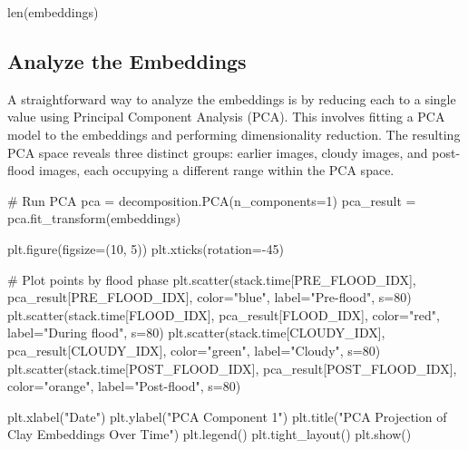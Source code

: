 \documentclass[
  letterpaper,
  DIV=11,
  numbers=noendperiod]{scrreprt}
\newenvironment{Shaded}{\begin{snugshade}}{\end{snugshade}}
\newcommand{\BuiltInTok}[1]{\textcolor[rgb]{0.00,0.23,0.31}{#1}}
\newcommand{\CommentTok}[1]{\textcolor[rgb]{0.37,0.37,0.37}{#1}}
\newcommand{\DecValTok}[1]{\textcolor[rgb]{0.68,0.00,0.00}{#1}}
\newcommand{\NormalTok}[1]{\textcolor[rgb]{0.00,0.23,0.31}{#1}}
\newcommand{\OperatorTok}[1]{\textcolor[rgb]{0.37,0.37,0.37}{#1}}
\newcommand{\StringTok}[1]{\textcolor[rgb]{0.13,0.47,0.30}{#1}}
\begin{document}
\begin{Shaded}
\begin{Highlighting}[]
\BuiltInTok{len}\NormalTok{(embeddings)}
\end{Highlighting}
\end{Shaded}

\subsection{Analyze the Embeddings}\label{analyze-the-embeddings-1}

A straightforward way to analyze the embeddings is by reducing each to a
single value using Principal Component Analysis (PCA). This involves
fitting a PCA model to the embeddings and performing dimensionality
reduction. The resulting PCA space reveals three distinct groups:
earlier images, cloudy images, and post-flood images, each occupying a
different range within the PCA space.

\begin{Shaded}
\begin{Highlighting}[]
\CommentTok{\# Run PCA}
\NormalTok{pca }\OperatorTok{=}\NormalTok{ decomposition.PCA(n\_components}\OperatorTok{=}\DecValTok{1}\NormalTok{)}
\NormalTok{pca\_result }\OperatorTok{=}\NormalTok{ pca.fit\_transform(embeddings)}

\NormalTok{plt.figure(figsize}\OperatorTok{=}\NormalTok{(}\DecValTok{10}\NormalTok{, }\DecValTok{5}\NormalTok{))}
\NormalTok{plt.xticks(rotation}\OperatorTok{={-}}\DecValTok{45}\NormalTok{)}

\CommentTok{\# Plot points by flood phase}
\NormalTok{plt.scatter(stack.time[PRE\_FLOOD\_IDX], pca\_result[PRE\_FLOOD\_IDX], color}\OperatorTok{=}\StringTok{"blue"}\NormalTok{, label}\OperatorTok{=}\StringTok{"Pre{-}flood"}\NormalTok{, s}\OperatorTok{=}\DecValTok{80}\NormalTok{)}
\NormalTok{plt.scatter(stack.time[FLOOD\_IDX], pca\_result[FLOOD\_IDX], color}\OperatorTok{=}\StringTok{"red"}\NormalTok{, label}\OperatorTok{=}\StringTok{"During flood"}\NormalTok{, s}\OperatorTok{=}\DecValTok{80}\NormalTok{)}
\NormalTok{plt.scatter(stack.time[CLOUDY\_IDX], pca\_result[CLOUDY\_IDX], color}\OperatorTok{=}\StringTok{"green"}\NormalTok{, label}\OperatorTok{=}\StringTok{"Cloudy"}\NormalTok{, s}\OperatorTok{=}\DecValTok{80}\NormalTok{)}
\NormalTok{plt.scatter(stack.time[POST\_FLOOD\_IDX], pca\_result[POST\_FLOOD\_IDX], color}\OperatorTok{=}\StringTok{"orange"}\NormalTok{, label}\OperatorTok{=}\StringTok{"Post{-}flood"}\NormalTok{, s}\OperatorTok{=}\DecValTok{80}\NormalTok{)}

\NormalTok{plt.xlabel(}\StringTok{"Date"}\NormalTok{)}
\NormalTok{plt.ylabel(}\StringTok{"PCA Component 1"}\NormalTok{)}
\NormalTok{plt.title(}\StringTok{"PCA Projection of Clay Embeddings Over Time"}\NormalTok{)}
\NormalTok{plt.legend()}
\NormalTok{plt.tight\_layout()}
\NormalTok{plt.show()}
\end{Highlighting}
\end{Shaded}
\end{document}
